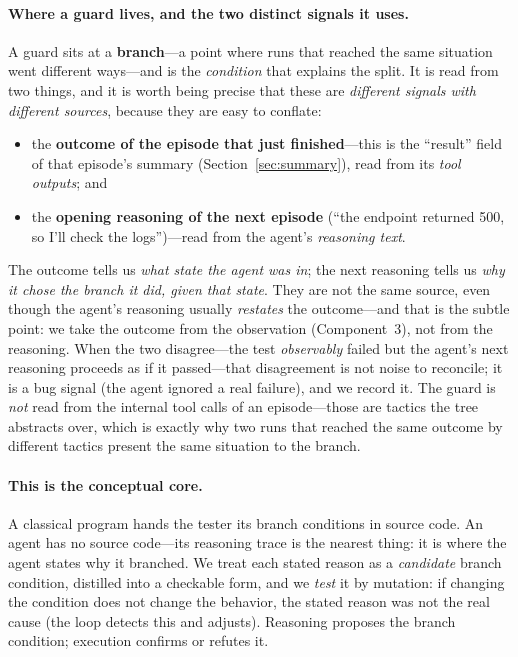 \documentclass[11pt]{article}
\begin{document}
\paragraph{Where a guard lives, and the two distinct signals it uses.} A guard
sits at a \textbf{branch}---a point where runs that reached the same situation
went different ways---and is the \emph{condition} that explains the split. It is
read from two things, and it is worth being precise that these are
\emph{different signals with different sources}, because they are easy to
conflate:
\begin{itemize}[leftmargin=1.5em, itemsep=1pt]
  \item the \textbf{outcome of the episode that just finished}---this is the
  ``result'' field of that episode's summary (Section~\ref{sec:summary}), read
  from its \emph{tool outputs}; and
  \item the \textbf{opening reasoning of the next episode} (``the endpoint
  returned 500, so I'll check the logs'')---read from the agent's \emph{reasoning
  text}.
\end{itemize}
The outcome tells us \emph{what state the agent was in}; the next reasoning tells
us \emph{why it chose the branch it did, given that state}. They are not the same
source, even though the agent's reasoning usually \emph{restates} the
outcome---and that is the subtle point: we take the outcome from the observation
(Component~3), not from the reasoning. When the two disagree---the test
\emph{observably} failed but the agent's next reasoning proceeds as if it
passed---that disagreement is not noise to reconcile; it is a bug signal (the
agent ignored a real failure), and we record it. The guard is \emph{not} read
from the internal tool calls of an episode---those are tactics the tree abstracts
over, which is exactly why two runs that reached the same outcome by different
tactics present the same situation to the branch.

\paragraph{This is the conceptual core.} A classical program hands the tester its
branch conditions in source code. An agent has no source code---its reasoning
trace is the nearest thing: it is where the agent states why it branched. We
treat each stated reason as a \emph{candidate} branch condition, distilled into
a checkable form, and we \emph{test} it by mutation: if changing the condition
does not change the behavior, the stated reason was not the real cause (the loop
detects this and adjusts). Reasoning proposes the branch condition; execution
confirms or refutes it.
\end{document}
